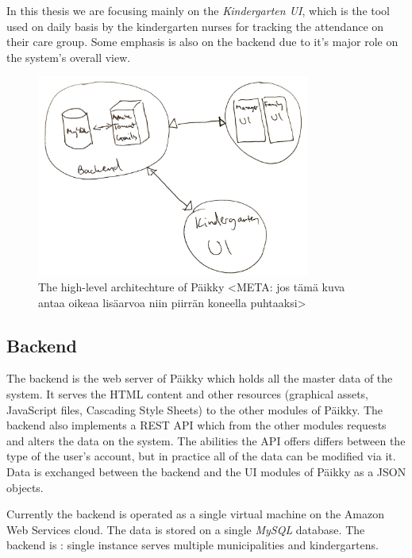 In this thesis we are focusing mainly on the \textit{Kindergarten UI}, which is the tool used on daily basis by the kindergarten nurses for tracking the attendance on their care group. Some emphasis is also on the backend due to it's major role on the system's overall view.

\begin{figure}[t]
\begin{center}
\includegraphics[width=0.8\textwidth]{assets/architechture.png}
\end{center}
\caption{The high-level architechture of Päikky <META: jos tämä kuva antaa oikeaa lisäarvoa niin piirrän koneella puhtaaksi>}
\label{fig:architechture}
\end{figure}



\subsection{Backend}

The backend is the web server of Päikky which holds all the master data of the system. It serves the HTML content and other resources (graphical assets, JavaScript files, Cascading Style Sheets) to the other modules of Päikky. The backend also implements a REST API which from the other modules requests and alters the data on the system. The abilities the API offers differs between the type of the user's account, but in practice all of the data can be modified via it. Data is exchanged between the backend and the UI modules of Päikky as a JSON objects.

Currently the backend is operated as a single virtual machine on the Amazon Web Services cloud. The data is stored on a single \textit{MySQL} database. The backend is : single instance serves multiple municipalities and kindergartens. %

